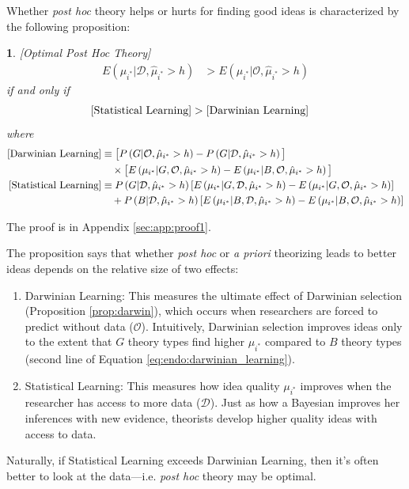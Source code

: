 \documentclass[12pt,english]{article}
\theoremstyle{plain}
\theoremstyle{plain}
\newtheorem{prop}[thm]{\protect\propositionname}
\providecommand{\propositionname}{Proposition}
\providecommand{\propositionname}{Proposition}
\begin{document}
Whether \emph{post hoc} theory helps or hurts for finding good ideas is characterized by the following proposition:
\begin{prop}\label{prop:optimal_post_hoc}
{[}Optimal Post Hoc Theory{]}
\begin{align}
E\left(\mu_{i^{\ast}}|\mathcal{\mathcal{D}},\hat{\mu}_{i^{\ast}}>h\right) & >E\left(\mu_{i^{\ast}}|\mathcal{O},\hat{\mu}_{i^{\ast}}>h\right)
\end{align}
if and only if 
\begin{align}
\text{\ensuremath{\left[\text{Statistical Learning}\right]}} & >\left[\text{Darwinian Learning}\right]
\end{align}
where 
\begin{align}
\left[\text{Darwinian Learning}\right] 
& \equiv
    \big[
        P\left(G|\mathcal{O},\hat{\mu}_{i^{\ast}}>h\right)-
    P\left(G|\mathcal{D},\hat{\mu}_{i^{\ast}}>h\right)
    \big]
    \notag
    \\
& \quad\times
\big[
    E\left(\mu_{i^{\ast}}|G,\mathcal{O},\hat{\mu}_{i^{\ast}}>h\right) - 
    E\left(\mu_{i^{\ast}}|B,\mathcal{O},\hat{\mu}_{i^{\ast}}>h\right)
\big] 
\label{eq:endo:darwinian_learning} \\
\left[\text{Statistical Learning}\right] & 
\equiv 
P\left(G|\mathcal{D}, \hat{\mu}_{i^{\ast}}>h\right)\left[
    E\left(\mu_{i^{\ast}}|G,\mathcal{D}, \hat{\mu}_{i^{\ast}}>h\right) - 
    E\left(\mu_{i^{\ast}}|G,\mathcal{O}, \hat{\mu}_{i^{\ast}}>h\right)
\right] \notag \\ 
& \quad +
P\left(B|\mathcal{D}, \hat{\mu}_{i^{\ast}}>h\right)\left[
    E\left(\mu_{i^{\ast}}|B,\mathcal{D}, \hat{\mu}_{i^{\ast}}>h\right) - 
    E\left(\mu_{i^{\ast}}|B,\mathcal{O}, \hat{\mu}_{i^{\ast}}>h\right)
\right]
\label{eq:endo:statistical_learning}
\end{align}
\end{prop}
The proof is in Appendix \ref{sec:app:proof1}.

The proposition says that whether \emph{post hoc} or \emph{a priori}  theorizing leads to better ideas depends on the relative size of two effects:
\begin{enumerate}
    \item Darwinian Learning: This measures the ultimate effect of Darwinian selection (Proposition \ref{prop:darwin}), which occurs when researchers are forced to predict without data ($\mathcal{O}$).  Intuitively, Darwinian selection improves ideas only to the extent that $G$ theory types find higher $\mu_{i^\ast}$ compared to $B$ theory types (second line of Equation \eqref{eq:endo:darwinian_learning}). 
    \item Statistical Learning: This measures how idea quality $\mu_{i^{\ast}}$ improves when the researcher has access to more data ($\mathcal{D}$). Just as how a Bayesian improves her inferences with new evidence, theorists develop higher quality ideas with access to data. 
\end{enumerate}
Naturally, if Statistical Learning exceeds Darwinian Learning, then it's often better to look at the data---i.e. \emph{post hoc} theory may be optimal.
\end{document}
